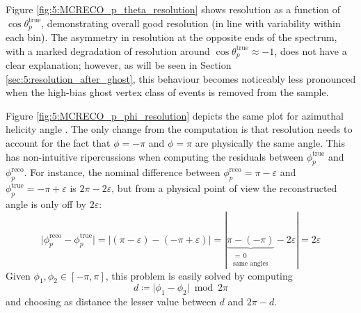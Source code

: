 Figure \ref{fig:5:MCRECO_p_theta_resolution} shows \cthetap resolution as a function of $\cos\theta_p^\text{true}$, demonstrating overall good resolution (in line with \cthetap variability within each bin).
The asymmetry in resolution at the opposite ends of the \cthetap spectrum, with a marked degradation of resolution around $\cos\theta_p^\text{true} \approx -1$, does not have a clear explanation;
however, as will be seen in Section \ref{sec:5:resolution_after_ghost}, this behaviour becomes noticeably less pronounced when the high-bias ghost vertex class of events is removed from the sample.

Figure \ref{fig:5:MCRECO_p_phi_resolution} depicts the same plot for azimuthal helicity angle \phip.
The only change from the \cthetap computation is that \phip resolution needs to account for the fact that $\phi=-\pi$ and $\phi=\pi$ are physically the same angle.
This has non-intuitive ripercussions when computing the residuals between $\phi_p^\text{true}$ and $\phi_p^\text{reco}$.
For instance, the nominal difference between $\phi_p^\text{reco}=\pi - \varepsilon$ and $\phi_p^\text{true}=-\pi + \varepsilon$ is $2\pi - 2\varepsilon$, but from a physical point of view the reconstructed angle is only off by $2\varepsilon$:
\begin{equation}
\lvert
\phi_p^\text{reco} - \phi_p^\text{true}
\rvert
=
|
\left( \pi - \varepsilon \right)
-
\left(- \pi + \varepsilon \right)
|
=
|
\underbrace{\pi - \left( -\pi \right)}_{\substack{=\,0 \\ \text{same angles}}}
- 2\varepsilon
|
= 2\varepsilon
\end{equation}
Given $\phi_1, \phi_2 \in [-\pi, \pi]$, this problem is easily solved by computing 
\begin{equation}
d \coloneqq \lvert \phi_1 - \phi_2 \rvert \bmod 2\pi
\end{equation}
and choosing as distance the lesser value between $d$ and $2\pi-d$.


